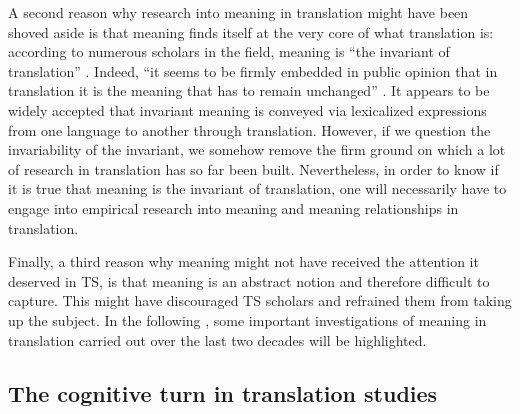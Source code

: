 A second reason why research into meaning in translation might have been shoved aside is that meaning finds itself at the very core of what translation is: according to numerous scholars in the field, meaning is “the invariant of translation” \citep[82]{lewandowska-tomasczyk_specification_2010}. Indeed, “it seems to be firmly embedded in public opinion that in translation it is the meaning that has to remain unchanged” \citep[82]{lewandowska-tomasczyk_specification_2010}. It appears to be widely accepted that invariant meaning is conveyed via lexicalized expressions from one language to another through translation. However, if we question the invariability of the invariant, we somehow remove the firm ground on which a lot of research in translation has so far been built. Nevertheless, in order to know if it is true that meaning is the invariant of translation, one will necessarily have to engage into empirical research into meaning and meaning relationships in translation.

Finally, a third reason why meaning might not have received the attention it deserved in TS, is that meaning is an abstract notion and therefore difficult to capture. This might have discouraged TS scholars and refrained them from taking up the subject. In the following , some important investigations of meaning in translation carried out over the last two decades will be highlighted.

\subsection{The cognitive turn in translation studies}
\label{sec:2.2.3}  
